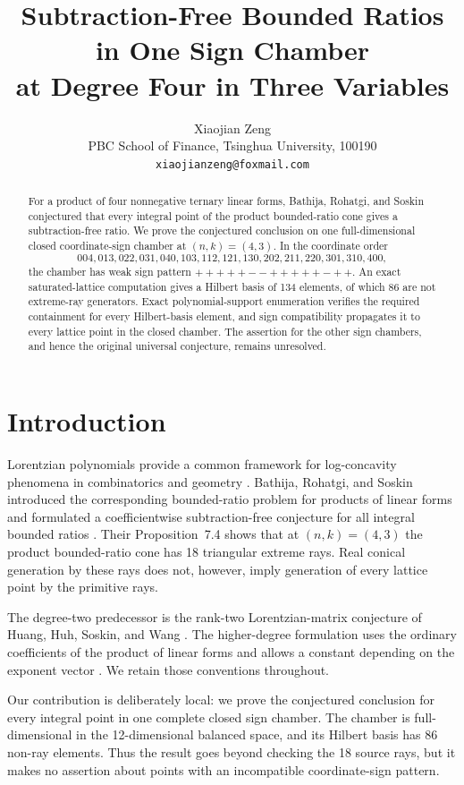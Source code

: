 \documentclass[11pt]{article}
\title{Subtraction-Free Bounded Ratios in One Sign Chamber\\
at Degree Four in Three Variables}
\author{Xiaojian Zeng\\
PBC School of Finance, Tsinghua University, 100190\\
\texttt{xiaojianzeng@foxmail.com}}
\date{}
\theoremstyle{definition}
\begin{document}
\maketitle

\begin{abstract}
For a product of four nonnegative ternary linear forms, Bathija, Rohatgi,
and Soskin conjectured that every integral point of the product
bounded-ratio cone gives a subtraction-free ratio.  We prove the conjectured
conclusion on one full-dimensional closed coordinate-sign chamber at
$(n,k)=(4,3)$.  In the coordinate order
\[
004,013,022,031,040,103,112,121,130,202,211,220,301,310,400,
\]
the chamber has weak sign pattern \(+++++--+++++-++\).  An exact
saturated-lattice computation gives a Hilbert basis of 134 elements, of
which 86 are not extreme-ray generators.  Exact polynomial-support
enumeration verifies the required containment for every Hilbert-basis
element, and sign compatibility propagates it to every lattice point in the
closed chamber.  The assertion for the other sign chambers, and hence the
original universal conjecture, remains unresolved.
\end{abstract}

\section{Introduction}

Lorentzian polynomials provide a common framework for log-concavity
phenomena in combinatorics and geometry \cite{BrandenHuh2020}.  Bathija,
Rohatgi, and Soskin introduced the corresponding bounded-ratio problem for
products of linear forms and formulated a coefficientwise
subtraction-free conjecture for all integral bounded ratios
\cite{BathijaRohatgiSoskin2026}.  Their Proposition~7.4 shows that at
$(n,k)=(4,3)$ the product bounded-ratio cone has 18 triangular extreme
rays.  Real conical generation by these rays does not, however, imply
generation of every lattice point by the primitive rays.

The degree-two predecessor is the rank-two Lorentzian-matrix conjecture of
Huang, Huh, Soskin, and Wang \cite[Conjecture~5.5]{HuangHuhSoskinWang2025}.
The higher-degree formulation uses the ordinary coefficients of the product
of linear forms and allows a constant depending on the exponent vector
\cite[Definitions~5.4 and~9.1]{BathijaRohatgiSoskin2026}.  We retain those
conventions throughout.

Our contribution is deliberately local: we prove the conjectured conclusion
for every integral point in one complete closed sign chamber.  The chamber
is full-dimensional in the 12-dimensional balanced space, and its Hilbert
basis has 86 non-ray elements.  Thus the result goes beyond checking the 18
source rays, but it makes no assertion about points with an incompatible
coordinate-sign pattern.
\end{document}
